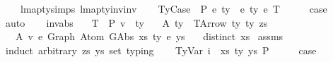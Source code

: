 \begin{isabellebody}
\ \ \ \ lmap{\isacharunderscore}{\kern0pt}ty{\isachardot}{\kern0pt}simps{\isacharparenleft}{\kern0pt}{}{\isacharparenright}{\kern0pt}\ lmap{\isacharunderscore}{\kern0pt}ty{\isacharunderscore}{\kern0pt}inv{\isacharunderscore}{\kern0pt}inv{\isacharparenright}{\kern0pt}\isanewline
{}\isamarkupfalse%
\isanewline
\ \ \isamarkupfalse%
\ {\isacharparenleft}{\kern0pt}TyCase\ {\isasymGamma}\ P\ e{}\ ty{}\ {\isasymGamma}{}\ e{}\ ty{}\ e{}\ T{\isacharparenright}{\kern0pt}\isanewline
\ \ \isamarkupfalse%
\ \isamarkupfalse%
\ {\isacharquery}{\kern0pt}case\isanewline
\ \ \isamarkupfalse%
\ auto\isanewline
\ \ \isamarkupfalse%
\isanewline
{}\isamarkupfalse%
%
\endisatagproof
{\isafoldproof}%
%
\isadelimproof
\isanewline
%
\endisadelimproof
\isanewline
\isanewline
{}\isamarkupfalse%
\ inv{\isacharunderscore}{\kern0pt}abs{}{\isacharcolon}{\kern0pt}\isanewline
\ \ \ T{\isacharcolon}{\kern0pt}\ {\isachardoublequoteopen}{\isasymGamma}\ {\isasymturnstile}{\isacharbraceleft}{\kern0pt}P{\isacharbraceright}{\kern0pt}\ v\ {\isacharcolon}{\kern0pt}\ ty{\isachardoublequoteclose}\isanewline
\ \ \ A{}{\isacharcolon}{\kern0pt}\ {\isachardoublequoteopen}ty\ {\isacharequal}{\kern0pt}\ TArrow\ ty{}\ ty{}\ zs{\isachardoublequoteclose}\isanewline
\ \ \ A{}{\isacharcolon}{\kern0pt}\ {\isachardoublequoteopen}v\ {\isasymsimeq}e\ Graph\ {\isacharparenleft}{\kern0pt}Atom\ {\isacharparenleft}{\kern0pt}GAbs\ xs\ ty{}{\isacharprime}{\kern0pt}\ e{\isacharprime}{\kern0pt}{\isacharparenright}{\kern0pt}\ ys{\isacharparenright}{\kern0pt}{\isachardoublequoteclose}\isanewline
\ \ \ {\isachardoublequoteopen}distinct\ xs{\isachardoublequoteclose}\isanewline
%
\isadelimproof
%
\endisadelimproof
%
\isatagproof
{}\isamarkupfalse%
\ assms\isanewline
{}\isamarkupfalse%
\ {\isacharparenleft}{\kern0pt}induct\ arbitrary{\isacharcolon}{\kern0pt}\ zs\ ys\ set{\isacharcolon}{\kern0pt}\ typing{\isacharparenright}{\kern0pt}\isanewline
\ \ \isamarkupfalse%
\ {\isacharparenleft}{\kern0pt}TyVar\ i\ {\isasymGamma}\ xs\ ty\ ys\ P{\isacharparenright}{\kern0pt}\isanewline
\ \ \isamarkupfalse%
\ \isamarkupfalse%
\ {\isacharquery}{\kern0pt}case\isanewline

\end{isabellebody}
